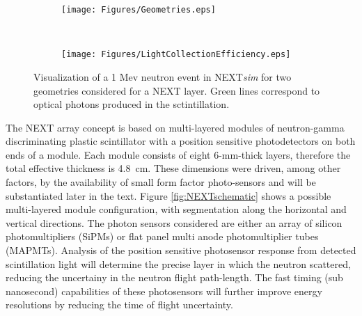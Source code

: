\documentclass[preprint,3p,twocolumn]{elsarticle}
\begin{document}
\begin{figure}[!ht]
 \centering
 \begin{subfigure}{\linewidth}
  \centering
  \texttt{[image: Figures/Geometries.eps]}
 \caption{}
 \end{subfigure}%
 \\
 \begin{subfigure}{\linewidth}
  \centering
  \texttt{[image: Figures/LightCollectionEfficiency.eps]}
  \caption{}
 \end{subfigure}%
 \caption{Visualization of a 1 Mev neutron event in NEXT\emph{sim} for two geometries considered for a NEXT layer. Green lines correspond to optical photons produced in the sctintillation.}
 \label{fig:Geometries}
\end{figure} 


The NEXT array concept is based on multi-layered modules of neutron-gamma discriminating plastic scintillator with a position sensitive photodetectors on both ends of a module. Each module consists of eight 6-mm-thick layers, therefore the total effective thickness is 4.8~cm. These dimensions were driven, among other factors, by the availability of small form factor photo-sensors and will be substantiated later in the text. Figure \ref{fig:NEXTschematic} shows a possible multi-layered module configuration, with segmentation along the horizontal and vertical directions. The photon sensors considered are either an array of silicon photomultipliers (SiPMs) or flat panel multi anode photomultiplier tubes (MAPMTs). Analysis of the position sensitive photosensor response from detected scintillation light will determine the precise layer in which the neutron scattered, reducing the uncertainy in the neutron flight path-length. The fast timing (sub nanosecond) capabilities of these photosensors will further improve energy resolutions by reducing the time of flight uncertainty. 




\end{document}
